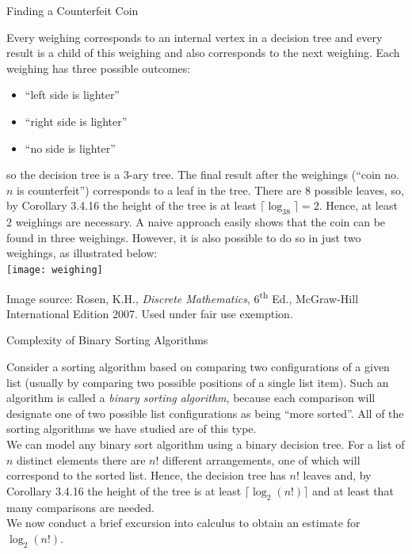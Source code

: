 \documentclass[smaller,hyperref={CJKbookmarks=true}]{beamer}
\begin{document}
\begin{frame}{Finding a Counterfeit Coin}
\begin{spacing}{1.1}
\vspace*{10pt}
Every weighing corresponds to an internal vertex in a decision tree and
every result is a child of this weighing and also corresponds to the next
weighing. Each weighing has three possible outcomes:
\begin{itemize}
  \item ``left side is lighter''
  \item ``right side is lighter''
  \item ``no side is lighter''
\end{itemize}
so the decision tree is a 3-ary tree. The final result after the weighings (``coin no. $n$ is counterfeit'') corresponds to a leaf in the tree. There are 8 possible leaves, so, by Corollary 3.4.16 the height of the tree is at least $\lceil\log_38\rceil=2$. Hence, at least 2 weighings are necessary.
\newpage
\vspace*{10pt}
A naive approach easily shows that the coin can be found in three
weighings. However, it is also possible to do so in just two weighings, as
illustrated below:\\
\texttt{[image: weighing]}\\
\begin{center}
\begin{spacing}{0.5}
\begin{tiny}
Image source: Rosen, K.H., \emph{Discrete Mathematics}, 6\textsuperscript{th} Ed., McGraw-Hill International Edition 2007. Used under fair use
exemption.
\end{tiny}
\end{spacing}
\end{center}
\end{spacing}
\end{frame}
\begin{frame}[c]{Complexity of Binary Sorting Algorithms}
\begin{spacing}{1.1}
Consider a sorting algorithm based on comparing two configurations of a
given list (usually by comparing two possible positions of a single list
item). Such an algorithm is called a \emph{binary sorting algorithm}, because each
comparison will designate one of two possible list configurations as being
``more sorted''. All of the sorting algorithms we have studied are of this
type.\\[6pt]
We can model any binary sort algorithm using a binary decision tree. For a
list of $n$ distinct elements there are $n!$ different arrangements, one of which
will correspond to the sorted list. Hence, the decision tree has $n!$ leaves and, by Corollary 3.4.16 the height of the tree is at least $\lceil\log_2(n!)\rceil$ and at least that many comparisons are needed.\\[6pt]
We now conduct a brief excursion into calculus to obtain an estimate for $\log_2(n!)$.
\end{spacing}
\end{frame}
\end{document}

